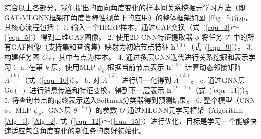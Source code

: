 综合以上各部分，我们提出的面向角度变化的样本间关系挖掘元学习方法（即GAF-MLGNN框架在角度鲁棒性视角下的应用）的整体框架如图~\ref{Fig_5}所示。其核心流程包括：
1.  输入一个HRRP样本，通过GAF变换（式~(\ref{equ_3})〜(\ref{equ_5})）得到二维GAF图像。
2.  使用2D-CNN特征提取器 $\phi$ 将任务 $\mathcal{T}$ 中的所有GAF图像（支持集和查询集）映射为初始节点特征 $\mathbf{h}^{(0)}$（式~(\ref{equ_9})）。
3.  构建任务图 $G_{\mathcal{T}}$，其中节点为样本。
4.  通过多层GNN迭代进行关系挖掘和表示学习：
    a.  在第 $k$ 层，使用MLP $\psi_{\tilde{\theta}}$ 根据当前节点表示 $\mathbf{h}^{(k)}$ 计算动态邻接矩阵 $\tilde{A}^{(k)}$（式~(\ref{equ_10})）。
    b.  对 $\tilde{A}^{(k)}$ 进行归一化得到 $\hat{A}^{(k)}$。
    c.  通过GNN层 $\mathrm{Gc}(\cdot)$ 进行消息传递和特征变换，得到下一层表示 $\mathbf{h}^{(k+1)}$（式~(\ref{equ_11})）。
5.  将查询节点的最终表示送入Softmax分类器得到预测结果。
6.  整个模型（CNN $\phi$、MLP $\psi_{\tilde{\theta}}$、GNN层 $\theta^{(k)}$）的参数 $\Theta$ 通过MLGNN元学习框架（Algorithm \ref{Alg_1}, \ref{Alg_2}, 式~(\ref{equ_12})〜(\ref{equ_15})）进行优化，目标是学习一个能够快速适应包含角度变化的新任务的良好初始化。

